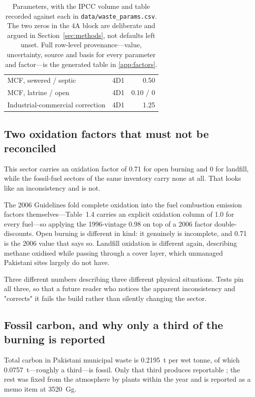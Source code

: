 \begin{table}[htbp]
\begin{tabular}{@{}llr@{}}
MCF, sewered / septic     & 4D1 & 0.50 \\
MCF, latrine / open       & 4D1 & 0.10 / 0 \\
Industrial-commercial correction & 4D1 & 1.25 \\
\bottomrule
\end{tabular}
\caption{Parameters, with the IPCC volume and table recorded against each in
\texttt{data/waste\_params.csv}. The two zeros in the 4A block are deliberate and argued in
Section~\ref{sec:methods}, not defaults left unset. Full row-level provenance---value,
uncertainty, source and basis for every parameter and factor---is the generated table in
\ref{app:factors}.}
\label{tab:params}
\end{table}

\subsection{Two oxidation factors that must not be reconciled}

This sector carries an oxidation factor of \num{0.71} for open burning and \num{0} for
landfill, while the fossil-fuel sectors of the same inventory carry none at all. That looks
like an inconsistency and is not.

The 2006 Guidelines fold complete oxidation into the fuel combustion emission factors
themselves---Table~1.4 carries an explicit oxidation column of \num{1.0} for every fuel---so
applying the 1996-vintage \num{0.98} on top of a 2006 factor double-discounts. Open burning is
different in kind: it genuinely is incomplete, and \num{0.71} is the 2006 value that says so.
Landfill oxidation is different again, describing methane oxidised while passing through a
cover layer, which unmanaged Pakistani sites largely do not have.

Three different numbers describing three different physical situations. Tests pin all three,
so that a future reader who notices the apparent inconsistency and "corrects" it fails the
build rather than silently changing the sector.

\subsection{Fossil carbon, and why only a third of the burning \COtwo{} is reported}

Total carbon in Pakistani municipal waste is \SI{0.2195}{\tonne} per wet tonne, of which
\SI{0.0757}{\tonne}---roughly a third---is fossil. Only that third produces reportable
\COtwo{}; the rest was fixed from the atmosphere by plants within the year and is reported as
a memo item at \SI{3520}{\giga\gram}.

